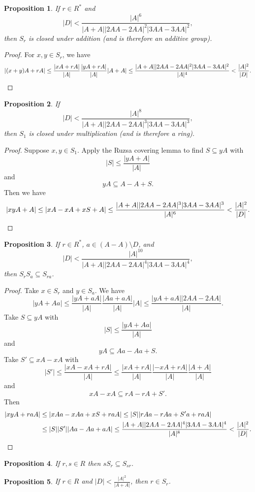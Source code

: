 \documentclass[letterpaper,11pt]{article}
\newtheorem{prop}{Proposition}
\theoremstyle{definition}
\theoremstyle{remark}
\begin{document}
\begin{prop} If $r \in R^*$ and
\[
|D| < \frac{|A|^6}{|A+A||2AA-2AA|^2|3AA-3AA|^2},
\]
then $S_r$ is closed under addition (and is therefore an additive group).
\end{prop}
\begin{proof} For $x,y \in S_r$, we have
\[
|(x+y)A + rA| \le \frac{|xA+rA|}{|A|}\frac{|yA+rA|}{|A|}|A+A| \le \frac{|A+A||2AA-2AA|^2|3AA-3AA|^2}{|A|^4} < \frac{|A|^2}{|D|}.\qedhere
\]
\end{proof}

\begin{prop} If
\[
|D| < \frac{|A|^8}{|A+A||2AA-2AA|^3|3AA-3AA|^3},
\]
then $S_1$ is closed under multiplication (and is therefore a ring).
\end{prop}
\begin{proof} Suppose $x,y \in S_1$. Apply the Ruzsa covering lemma to find $S \subseteq yA$ with
\[
|S| \le \frac{|yA+A|}{|A|}
\]
and
\[
yA \subseteq A-A+S.
\]
Then we have
\[
|xyA+A| \le |xA-xA+xS+A| \le \frac{|A+A||2AA-2AA|^3|3AA-3AA|^3}{|A|^6} < \frac{|A|^2}{|D|}.\qedhere
\]
\end{proof}

\begin{prop} If $r \in R^*$, $a \in (A-A)\setminus D$, and
\[
|D| < \frac{|A|^{10}}{|A+A||2AA-2AA|^4|3AA-3AA|^4},
\]
then $S_rS_a \subseteq S_{ra}$.
\end{prop}
\begin{proof} Take $x \in S_r$ and $y \in S_a$. We have
\[
|yA+Aa| \le \frac{|yA+aA|}{|A|}\frac{|Aa+aA|}{|A|}|A| \le \frac{|yA+aA||2AA-2AA|}{|A|}.
\]
Take $S \subseteq yA$ with
\[
|S| \le \frac{|yA+Aa|}{|A|}
\]
and
\[
yA \subseteq Aa-Aa+S.
\]
Take $S' \subseteq xA-xA$ with
\[
|S'| \le \frac{|xA-xA+rA|}{|A|} \le \frac{|xA+rA|}{|A|}\frac{|-xA+rA|}{|A|}\frac{|A+A|}{|A|}
\]
and
\[
xA-xA \subseteq rA-rA+S'.
\]
Then
\begin{align*}
|xyA+raA| &\le |xAa-xAa+xS+raA| \le |S||rAa-rAa+S'a+raA|\\
&\le |S||S'||Aa-Aa+aA| \le \frac{|A+A||2AA-2AA|^4|3AA-3AA|^4}{|A|^8} < \frac{|A|^2}{|D|}.\qedhere
\end{align*}
\end{proof}

\begin{prop} If $r,s \in R$ then $sS_r \subseteq S_{sr}$.
\end{prop}

\begin{prop} If $r \in R$ and  $|D| < \frac{|A|^2}{|A+A|}$, then $r \in S_r$.
\end{prop}
\end{document}
